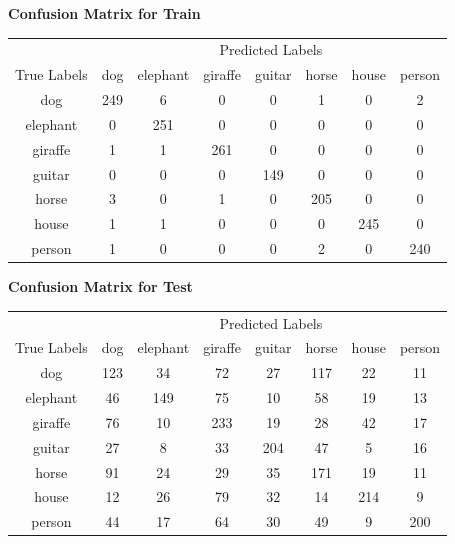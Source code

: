 \documentclass{article}
\begin{document}
\begin{center}
    \textbf{Confusion Matrix for Train}
    
    \begin{tabular}{c|ccccccc}
    \toprule
    & \multicolumn{7}{c}{Predicted Labels} \\
    \cmidrule(lr){2-8}
    True Labels & dog & elephant & giraffe & guitar & horse & house & person \\
    \midrule
    dog & 249 & 6 & 0 & 0 & 1 & 0 & 2 \\
    elephant & 0 & 251 & 0 & 0 & 0 & 0 & 0 \\
    giraffe & 1 & 1 & 261 & 0 & 0 & 0 & 0 \\
    guitar & 0 & 0 & 0 & 149 & 0 & 0 & 0 \\
    horse & 3 & 0 & 1 & 0 & 205 & 0 & 0 \\
    house & 1 & 1 & 0 & 0 & 0 & 245 & 0 \\
    person & 1 & 0 & 0 & 0 & 2 & 0 & 240 \\
    \bottomrule
    \end{tabular}
    \label{tab:confusion_matrix_train}
\end{center}

\begin{center}
    \textbf{Confusion Matrix for Test}
    
    \begin{tabular}{c|ccccccc}
    \toprule
    & \multicolumn{7}{c}{Predicted Labels} \\
    \cmidrule(lr){2-8}
    True Labels & dog & elephant & giraffe & guitar & horse & house & person \\
    \midrule
    dog & 123 & 34 & 72 & 27 & 117 & 22 & 11 \\
    elephant & 46 & 149 & 75 & 10 & 58 & 19 & 13 \\
    giraffe & 76 & 10 & 233 & 19 & 28 & 42 & 17 \\
    guitar & 27 & 8 & 33 & 204 & 47 & 5 & 16 \\
    horse & 91 & 24 & 29 & 35 & 171 & 19 & 11 \\
    house & 12 & 26 & 79 & 32 & 14 & 214 & 9 \\
    person & 44 & 17 & 64 & 30 & 49 & 9 & 200 \\
    \bottomrule
    \end{tabular}
    \label{tab:confusion_matrix_test}
\end{center}
\end{document}
